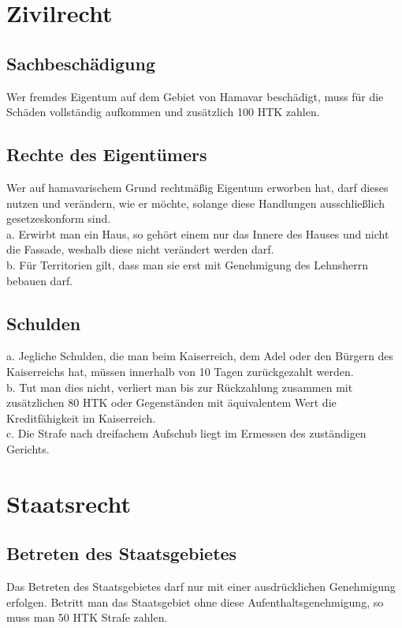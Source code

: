 \documentclass{article}
\begin{document}
\section{Zivilrecht}
\subsection{Sachbeschädigung}
Wer fremdes Eigentum auf dem Gebiet von Hamavar beschädigt, muss für die Schäden vollständig aufkommen und zusätzlich 100 HTK zahlen.

\subsection{Rechte des Eigentümers}
Wer auf hamavarischem Grund rechtmäßig Eigentum erworben hat, darf dieses nutzen und verändern, wie er möchte, solange diese Handlungen ausschließlich gesetzeskonform sind.\\
a. Erwirbt man ein Haus, so gehört einem nur das Innere des Hauses und nicht die Fassade, weshalb diese nicht verändert werden darf.\\
b. Für Territorien gilt, dass man sie erst mit Genehmigung des Lehnsherrn bebauen darf.

\subsection{Schulden}
a. Jegliche Schulden, die man beim Kaiserreich, dem Adel oder den Bürgern des Kaiserreichs hat, müssen innerhalb von 10 Tagen zurückgezahlt werden.\\
b. Tut man dies nicht, verliert man bis zur Rückzahlung zusammen mit zusätzlichen 80 HTK oder Gegenständen mit äquivalentem Wert die Kreditfähigkeit im Kaiserreich.\\
c. Die Strafe nach dreifachem Aufschub liegt im Ermessen des zuständigen Gerichts.

\section{Staatsrecht}

\subsection{Betreten des Staatsgebietes}
Das Betreten des Staatsgebietes darf nur mit einer ausdrücklichen Genehmigung erfolgen. Betritt man das Staatsgebiet ohne diese Aufenthaltsgenehmigung, so muss man 50 HTK Strafe zahlen.
\end{document}
